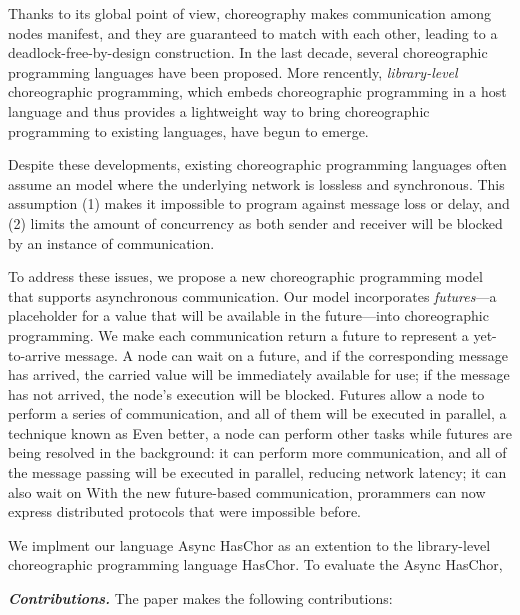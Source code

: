 Thanks to its global point of view, choreography makes communication among nodes manifest, and they are guaranteed to match with each other, leading to a deadlock-free-by-design construction.
%
In the last decade, several choreographic programming languages have been proposed.
%
More rencently, \emph{library-level} choreographic programming, which embeds choreographic programming in a host language and thus provides a lightweight way to bring choreographic programming to existing languages, have begun to emerge.

Despite these developments, existing choreographic programming languages often assume an model where the underlying network is lossless and synchronous.
%
This assumption (1) makes it impossible to program against message loss or delay, and (2) limits the amount of concurrency as both sender and receiver will be blocked by an instance of communication.

To address these issues, we propose a new choreographic programming model that supports asynchronous communication.
%
Our model incorporates \emph{futures}---a placeholder for a value that will be available in the future---into choreographic programming.
%
We make each communication return a future to represent a yet-to-arrive message.
%
A node can wait on a future, and if the corresponding message has arrived, the carried value will be immediately available for use;
%
if the message has not arrived, the node's execution will be blocked.
%
Futures allow a node to perform a series of communication, and all of them will be executed in parallel, a technique known as
Even better, a node can perform other tasks while futures are being resolved in the background:
%
it can perform more communication, and all of the message passing will be executed in parallel, reducing network latency;
%
it can also wait on
%
With the new future-based communication, prorammers can now express distributed protocols that were impossible before.

We implment our language Async HasChor as an extention to the library-level choreographic programming language HasChor.
%
To evaluate the Async HasChor,

\vspace{0.5cm}
\noindent \textit{\textbf{Contributions.}} The paper makes the following contributions:


